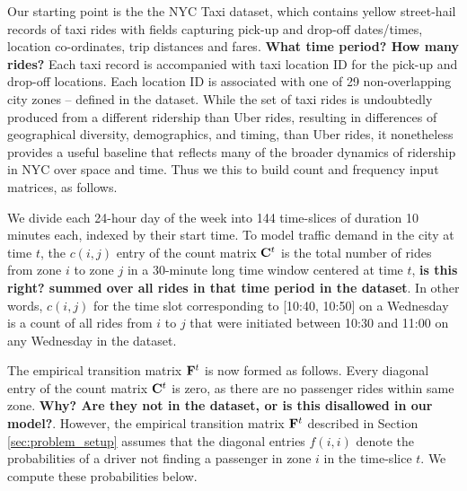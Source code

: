 Our starting point is the the NYC Taxi  dataset, which
contains yellow street-hail  records of taxi rides with fields capturing pick-up and drop-off dates/times, 
location co-ordinates, trip distances and fares. 
{\bf{What time period?  How many rides?}}
Each taxi record is accompanied with taxi location ID for the pick-up and drop-off locations. 
Each location ID is associated with one of 29 non-overlapping city zones -- defined in the
dataset.  While the set of taxi rides is undoubtedly produced from a different ridership than Uber
rides, resulting in differences of geographical diversity, demographics, and timing, than Uber rides, 
it nonetheless provides a useful baseline that reflects many of the broader dynamics of ridership in 
NYC over space and time.  Thus we this to build count and frequency input matrices, as follows.


We divide each 24-hour day of the week into 144 time-slices of duration 10 minutes each, indexed by their start 
time.  To model traffic demand in the city at time $t$, the $c(i,j)$ entry of the count matrix ${\mathbf{C}}^t$ is the total 
number of rides from zone $i$ to zone $j$ in a 30-minute long time window centered at time $t$, {\bf is this right?
summed over all rides in that time period in the dataset}.  In other words, $c(i, j)$ for the time slot corresponding
to [10:40, 10:50] on a Wednesday is a count of all rides from $i$ to $j$ that were initiated between 10:30 and 11:00 
on any Wednesday in the dataset.

The empirical transition matrix ${\mathbf{F}}^t$ is now formed as follows.
 Every diagonal entry of the count matrix ${\mathbf{C}}^t$ is zero, as there are no passenger rides within same zone. 
{\bf Why?  Are they not in the dataset, or is this disallowed in our model?}.
However, the empirical transition matrix ${\mathbf{F}}^t$ described in Section \ref{sec:problem_setup} assumes that the diagonal entries $f(i,i)$ denote the probabilities of a driver not finding a passenger in zone $i$ in the time-slice $t$. We compute these probabilities below.

